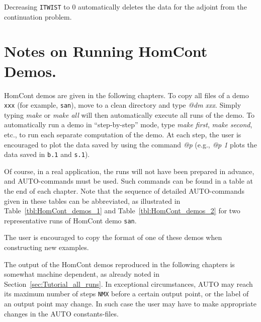 \documentclass[12pt]{report}
\begin{document}
Decreasing {\tt ITWIST} to 0 automatically deletes the data for the adjoint
from the continuation problem.


\section{ Notes on Running {\cal HomCont} Demos.} \label{sec:HomCont_Tutorial_examples}
{\cal HomCont} demos are given in the following chapters.
To copy all files of a demo {\tt xxx} (for example, {\tt san}),
move to a clean directory and type {\it @dm xxx}.
Simply typing {\it make} or {\it make all} will then automatically
execute all runs of the demo.
To automatically run a demo in ``step-by-step'' mode,
type  {\it make first}, {\it make second}, etc.,
to run each separate computation of the demo. 
At each step, the user is encouraged to plot the data
saved by using the command {\it @p} (e.g., {\it @p 1} plots the data
saved in {\tt b.1} and {\tt s.1}).

Of course, in a real application, the runs will not have been prepared
in advance, and {\cal AUTO}-commands must be used.
Such commands can be found in a table at the end of each chapter.
Note that the sequence of detailed {\cal AUTO}-commands given in these tables
can be abbreviated, as illustrated in Table~\ref{tbl:HomCont_demos_1} 
and Table~\ref{tbl:HomCont_demos_2} for two representative runs of 
{\cal HomCont} demo {\tt san}.


The user is encouraged to copy the format of one of these demos
when constructing new examples.

The output of the {\cal HomCont} demos reproduced in  the following chapters
is somewhat machine dependent, as already noted 
in Section~\ref{sec:Tutorial_all_runs}.
In exceptional circumstances, {\cal AUTO} may reach its maximum number of
steps {\tt NMX} before a certain output point, or the label of
an output point may change. In such case the user may have
to make appropriate changes in the {\cal AUTO} constants-files.
\end{document}
